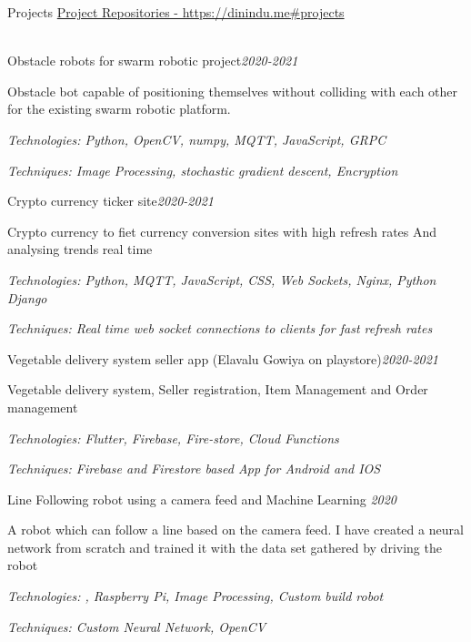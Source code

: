 \documentclass{resume} %
\begin{document}
\begin{rSection}{Projects}
\href{https://dinindu.me#projects}{Project Repositories - https://dinindu.me\#projects} \\ \\
\begin{rSubsection}{Obstacle robots for swarm robotic project}{\em {2020-2021}}{}{}
\item Obstacle bot capable of positioning themselves without colliding with each other for the existing swarm robotic platform. \item 
\textit{Technologies: Python, OpenCV, numpy, MQTT, JavaScript, GRPC}
\item \textit{Techniques: Image Processing, stochastic gradient descent, Encryption }
\end{rSubsection}

\begin{rSubsection}{Crypto currency ticker site}{\em {2020-2021}}{}{}
\item Crypto currency to fiet currency conversion sites with high refresh rates And analysing trends real time \item 
\textit{Technologies: Python, MQTT, JavaScript, CSS, Web Sockets, Nginx, Python Django}
\item \textit{Techniques: Real time web socket connections to clients for fast refresh rates}
\end{rSubsection}

\begin{rSubsection}{Vegetable delivery system seller app (Elavalu Gowiya on playstore)}{\em {2020-2021}}{}{}
\item Vegetable delivery system, Seller registration, Item Management and Order management \item 
\textit{Technologies: Flutter, Firebase, Fire-store, Cloud Functions}
\item \textit{Techniques: Firebase and Firestore based App for Android and IOS}
\end{rSubsection}

\begin{rSubsection}{Line Following robot using a camera feed and Machine Learning }{\em {2020}}{}{}
\item A robot which can follow a line based on the camera feed. I have created a neural network from scratch and trained it with the data set gathered by driving the robot \item 
\textit{Technologies: , Raspberry Pi, Image Processing, Custom build robot}
\item \textit{Techniques: Custom Neural Network, OpenCV }
\end{rSubsection}


\end{rSection}
\end{document}
